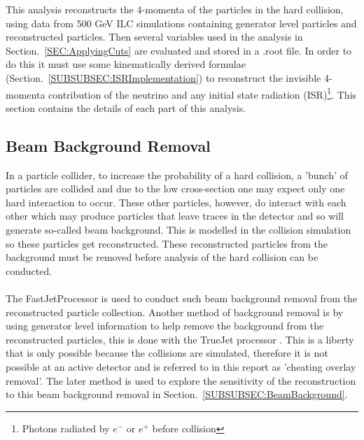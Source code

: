 This analysis reconstructs the 4-momenta of the particles in the hard collision, using data from 500 GeV ILC simulations containing generator level particles and reconstructed particles. Then several variables used in the analysis in Section.~\ref{SEC:ApplyingCuts} are evaluated and stored in a .root file. In order to do this it must use some kinematically derived formulae (Section.~\ref{SUBSUBSEC:ISRImplementation}) to reconstruct the invisible 4-momenta contribution of the neutrino and any initial state radiation (ISR)\footnote{Photons radiated by ${e}^{-}$ or ${e}^{+}$ before collision}. This section contains the details of each part of this analysis.

\subsection{Beam Background Removal}
\label{SUBSEC:BeamBackgroundRemoval}
In a particle collider, to increase the probability of a hard collision, a 'bunch' \cite{Herr:941318} of particles are collided and due to the low cross-section one may expect only one hard interaction to occur. These other particles, however, do interact with each other which may produce particles that leave traces in the detector and so will generate so-called beam background. This is modelled in the collision simulation so these particles get reconstructed. These reconstructed particles from the background must be removed before analysis of the hard collision can be conducted.
\\\\
The FastJetProcessor \cite{Cacciari:2011ma} is used to conduct such beam background removal from the reconstructed particle collection. Another method of background removal is by using generator level information to help remove the background from the reconstructed particles, this is done with the TrueJet processor \cite{MikaelBerggen2018}. This is a liberty that is only possible because the collisions are simulated, therefore it is not possible at an active detector and is referred to in this report as 'cheating overlay removal'. The later method is used to explore the sensitivity of the reconstruction to this beam background removal in Section.~\ref{SUBSUBSEC:BeamBackground}.

